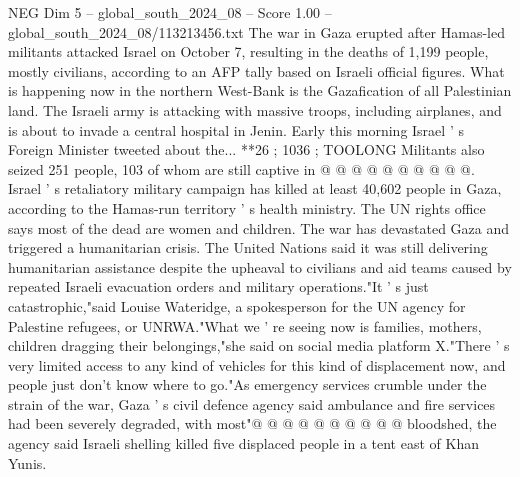 \begin{textsample}{NEG Dim 5 – global\_south\_2024\_08 – Score 1.00 – global\_south\_2024\_08/113213456.txt}
The war in Gaza erupted after Hamas-led militants attacked Israel on October 7, resulting in the deaths of 1,199 people, mostly civilians, according to an AFP tally based on Israeli official figures.
What is happening now in the northern West-Bank is the Gazafication of all Palestinian land.
The Israeli army is attacking with massive troops, including airplanes, and is about to invade a central hospital in Jenin.
Early this morning Israel ' s Foreign Minister tweeted about the... **26 ; 1036 ; TOOLONG Militants also seized 251 people, 103 of whom are still captive in @ @ @ @ @ @ @ @ @ @.
Israel ' s retaliatory military campaign has killed at least 40,602 people in Gaza, according to the Hamas-run territory ' s health ministry.
The UN rights office says most of the dead are women and children.
The war has devastated Gaza and triggered a humanitarian crisis.
The United Nations said it was still delivering humanitarian assistance despite the upheaval to civilians and aid teams caused by repeated Israeli evacuation orders and military operations."It ' s just catastrophic,"said Louise Wateridge, a spokesperson for the UN agency for Palestine refugees, or UNRWA."What we ' re seeing now is families, mothers, children dragging their belongings,"she said on social media platform X."There ' s very limited access to any kind of vehicles for this kind of displacement now, and people just don't know where to go."As emergency services crumble under the strain of the war, Gaza ' s civil defence agency said ambulance and fire services had been severely degraded, with most"@ @ @ @ @ @ @ @ @ @ bloodshed, the agency said Israeli shelling killed five displaced people in a tent east of Khan Yunis.

\end{textsample}
